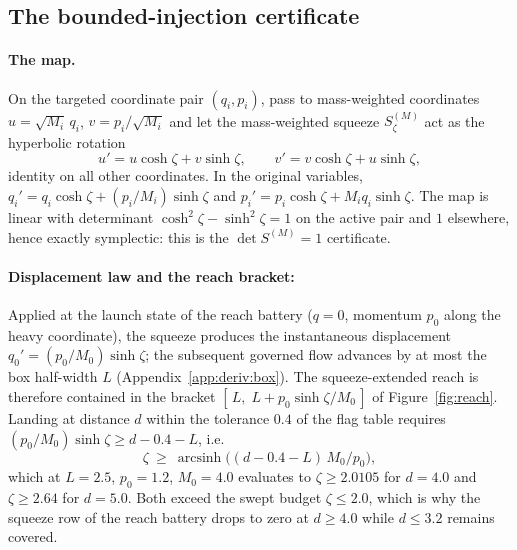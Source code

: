 \documentclass{article}
\begin{document}
\subsection{The bounded-injection certificate}
\label{app:deriv:squeeze}
\paragraph{The map.}
On the targeted coordinate pair $(q_i,p_i)$, pass to mass-weighted coordinates $u=\sqrt{M_i}\,q_i$, $v=p_i/\sqrt{M_i}$ and let the mass-weighted squeeze $S^{(M)}_\zeta$ act as the hyperbolic rotation
\[
u'=u\cosh\zeta+v\sinh\zeta,\qquad v'=v\cosh\zeta+u\sinh\zeta,
\]
identity on all other coordinates. In the original variables, $q_i'=q_i\cosh\zeta+(p_i/M_i)\sinh\zeta$ and $p_i'=p_i\cosh\zeta+M_iq_i\sinh\zeta$. The map is linear with determinant $\cosh^2\zeta-\sinh^2\zeta=1$ on the active pair and $1$ elsewhere, hence exactly symplectic: this is the $\det S^{(M)}=1$ certificate.

\paragraph{Displacement law and the reach bracket:}
Applied at the launch state of the reach battery ($q=0$, momentum $p_0$ along the heavy coordinate), the squeeze produces the instantaneous displacement $q_0'=(p_0/M_0)\sinh\zeta$; the subsequent governed flow advances by at most the box half-width $L$ (Appendix~\ref{app:deriv:box}). The squeeze-extended reach is therefore contained in the bracket $[\,L,\;L+p_0\sinh\zeta/M_0\,]$ of Figure~\ref{fig:reach}. Landing at distance $d$ within the tolerance $0.4$ of the flag table requires $(p_0/M_0)\sinh\zeta\ge d-0.4-L$, i.e.
\[
\zeta\ \ge\ \operatorname{arcsinh}\!\bigl((d-0.4-L)\,M_0/p_0\bigr),
\]
which at $L=2.5$, $p_0=1.2$, $M_0=4.0$ evaluates to $\zeta\ge2.0105$ for $d=4.0$ and $\zeta\ge2.64$ for $d=5.0$. Both exceed the swept budget $\zeta\le2.0$, which is why the squeeze row of the reach battery drops to zero at $d\ge4.0$ while $d\le3.2$ remains covered.
\end{document}
